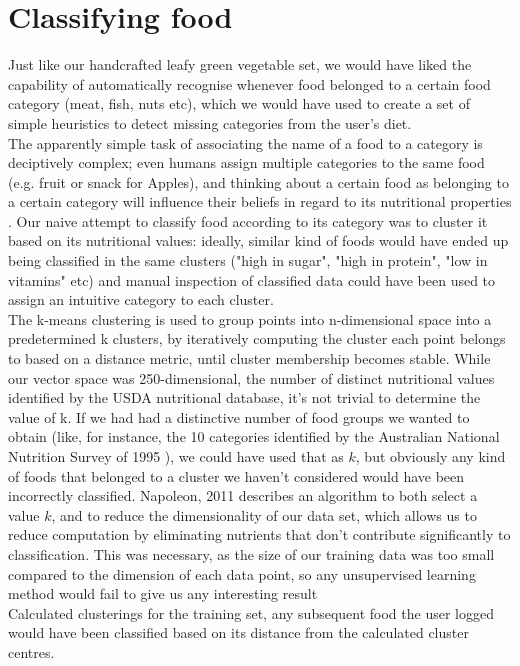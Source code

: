 \section*{Classifying food}
Just like our handcrafted leafy green vegetable set, we would have liked the capability of automatically recognise whenever food belonged to a certain food category (meat, fish, nuts etc), which we would have used to create a set of simple heuristics to detect missing categories from the user's diet. \\
The apparently simple task of associating the name of a food to a category is deciptively complex; even humans assign multiple categories to the same food (e.g. fruit or snack for Apples), and thinking about a certain food as belonging to a certain category will influence their beliefs in regard to its nutritional properties \cite{Hayes2011}.
Our naive attempt to classify food  according to its category was to cluster it based on its nutritional values: ideally, similar kind of foods would have ended up being classified in the same clusters ("high in sugar", "high in protein", "low in vitamins" etc) and manual inspection of classified data could have been used to assign an intuitive category to each cluster. \\
The k-means clustering is used to group points into n-dimensional space into a predetermined k clusters, by iteratively computing the cluster each point belongs to based on a distance metric, until cluster membership becomes stable. While our vector space was 250-dimensional, the number of distinct nutritional values identified by the USDA nutritional database, it's not trivial to determine the value of k. If we had had a distinctive number of food groups we wanted to obtain (like, for instance, the 10 categories identified by the Australian National Nutrition Survey of 1995 \cite{NSS1995}), we could have used that as $k$, but obviously any kind of foods that belonged to a cluster we haven't considered would have been incorrectly classified. Napoleon, 2011 \cite{Napoleon, 2011} describes an algorithm to both select a value $k$, and to reduce the dimensionality of our data set, which allows us to reduce computation by eliminating nutrients that don't contribute significantly to classification. This was necessary, as the size of our training data was too small compared to the dimension of each data point, so any unsupervised learning method would fail to give us any interesting result \cite{} \\
Calculated clusterings for the training set, any subsequent food the user logged would have been classified based on its distance from the calculated cluster centres.
